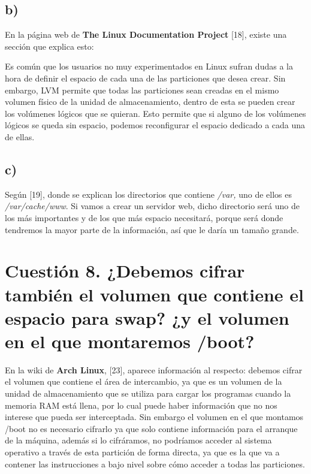 \subsection{b)}
En la página web de \textbf{The Linux Documentation Project} [18], existe una sección que explica esto:

Es común que los usuarios no muy experimentados en Linux sufran dudas a la hora de definir el espacio de cada una de las particiones que desea crear. Sin embargo, LVM permite que todas las particiones sean creadas en el mismo volumen físico de la unidad de almacenamiento, dentro de esta se pueden crear los volúmenes lógicos que se quieran. Esto permite que si alguno de los volúmenes lógicos se queda sin espacio, podemos reconfigurar el espacio dedicado a cada una de ellas.

\subsection{c)}
Según [19], donde se explican los directorios que contiene \textit{/var,} uno de ellos es \textit{/var/cache/www}.
Si vamos a crear un servidor web, dicho directorio será uno de los más importantes y de los que más espacio necesitará, porque será donde tendremos la mayor parte de la información, así que le daría un tamaño grande.



\section{Cuestión 8. ¿Debemos cifrar también el volumen que contiene el espacio
para swap? ¿y el volumen en el que montaremos /boot?}

En la wiki de \textbf{Arch Linux}, [23], aparece información al respecto: debemos cifrar el volumen que contiene el área de intercambio, ya que es un volumen de la unidad de almacenamiento que se utiliza para cargar los programas cuando la memoria RAM está llena, por lo cual puede haber información que no nos interese que pueda ser interceptada.
Sin embargo el volumen en el que montamos /boot no es necesario cifrarlo ya que solo contiene información para el arranque de la máquina, además si lo cifráramos, no podríamos acceder al sistema operativo a través de esta partición de forma directa, ya que es la que va a contener las instrucciones a bajo nivel sobre cómo acceder a todas las particiones.

